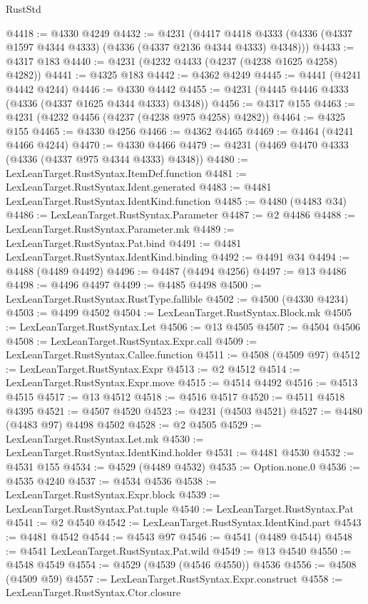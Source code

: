 \begin{lexlean}{RustStd}
\begin{coremodule}
@4418 := @4330 @4249
@4432 := @4231
    (@4417 @4418 @4333 (@4336 (@4337 @1597 @4344 @4333) (@4336 (@4337 @2136 @4344 @4333) @4348)))
@4433 := @4317 @183
@4440 := @4231 (@4232 @4433 (@4237 (@4238 @1625 @4258) @4282))
@4441 := @4325 @183
@4442 := @4362 @4249
@4445 := @4441 (@4241 @4442 @4244)
@4446 := @4330 @4442
@4455 := @4231 (@4445 @4446 @4333 (@4336 (@4337 @1625 @4344 @4333) @4348))
@4456 := @4317 @155
@4463 := @4231 (@4232 @4456 (@4237 (@4238 @975 @4258) @4282))
@4464 := @4325 @155
@4465 := @4330 @4256
@4466 := @4362 @4465
@4469 := @4464 (@4241 @4466 @4244)
@4470 := @4330 @4466
@4479 := @4231 (@4469 @4470 @4333 (@4336 (@4337 @975 @4344 @4333) @4348))
@4480 := LexLeanTarget.RustSyntax.ItemDef.function
@4481 := LexLeanTarget.RustSyntax.Ident.generated
@4483 := @4481 LexLeanTarget.RustSyntax.IdentKind.function
@4485 := @4480 (@4483 @34)
@4486 := LexLeanTarget.RustSyntax.Parameter
@4487 := @2 @4486
@4488 := LexLeanTarget.RustSyntax.Parameter.mk
@4489 := LexLeanTarget.RustSyntax.Pat.bind
@4491 := @4481 LexLeanTarget.RustSyntax.IdentKind.binding
@4492 := @4491 @34
@4494 := @4488 (@4489 @4492)
@4496 := @4487 (@4494 @4256)
@4497 := @13 @4486
@4498 := @4496 @4497
@4499 := @4485 @4498
@4500 := LexLeanTarget.RustSyntax.RustType.fallible
@4502 := @4500 (@4330 @4234)
@4503 := @4499 @4502
@4504 := LexLeanTarget.RustSyntax.Block.mk
@4505 := LexLeanTarget.RustSyntax.Let
@4506 := @13 @4505
@4507 := @4504 @4506
@4508 := LexLeanTarget.RustSyntax.Expr.call
@4509 := LexLeanTarget.RustSyntax.Callee.function
@4511 := @4508 (@4509 @97)
@4512 := LexLeanTarget.RustSyntax.Expr
@4513 := @2 @4512
@4514 := LexLeanTarget.RustSyntax.Expr.move
@4515 := @4514 @4492
@4516 := @4513 @4515
@4517 := @13 @4512
@4518 := @4516 @4517
@4520 := @4511 @4518 @4395
@4521 := @4507 @4520
@4523 := @4231 (@4503 @4521)
@4527 := @4480 (@4483 @97) @4498 @4502
@4528 := @2 @4505
@4529 := LexLeanTarget.RustSyntax.Let.mk
@4530 := LexLeanTarget.RustSyntax.IdentKind.holder
@4531 := @4481 @4530
@4532 := @4531 @155
@4534 := @4529 (@4489 @4532)
@4535 := Option.none.{0}
@4536 := @4535 @4240
@4537 := @4534 @4536
@4538 := LexLeanTarget.RustSyntax.Expr.block
@4539 := LexLeanTarget.RustSyntax.Pat.tuple
@4540 := LexLeanTarget.RustSyntax.Pat
@4541 := @2 @4540
@4542 := LexLeanTarget.RustSyntax.IdentKind.part
@4543 := @4481 @4542
@4544 := @4543 @97
@4546 := @4541 (@4489 @4544)
@4548 := @4541 LexLeanTarget.RustSyntax.Pat.wild
@4549 := @13 @4540
@4550 := @4548 @4549
@4554 := @4529 (@4539 (@4546 @4550)) @4536
@4556 := @4508 (@4509 @59)
@4557 := LexLeanTarget.RustSyntax.Expr.construct
@4558 := LexLeanTarget.RustSyntax.Ctor.closure

\end{coremodule}
\end{lexlean}
